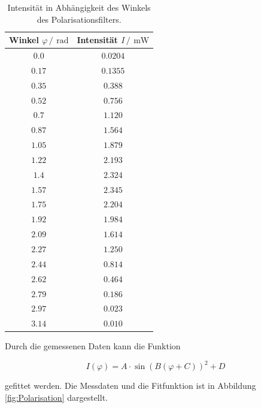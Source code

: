 \FloatBarrier
\begin{table}
  \centering
  \caption{Intensität in Abhängigkeit des Winkels des Polarisationsfilters.}
  \label{tab:Polarisation}
  \begin{tabular}{c c}
    \toprule
    Winkel $\varphi \,/\,\SI{}{\radian}$&Intensität $I\,/\,\SI{}{\milli\watt}$\\
    \midrule
    $\num{0.0}$&$\num{0.0204}$\\
    $\num{0.17}$&$\num{0.1355}$\\
    $\num{0.35}$&$\num{0.388}$\\
    $\num{0.52}$&$\num{0.756}$\\
    $\num{0.7}$&$\num{1.120}$\\
    $\num{0.87}$&$\num{1.564}$\\
    $\num{1.05}$&$\num{1.879}$\\
    $\num{1.22}$&$\num{2.193}$\\
    $\num{1.4}$&$\num{2.324}$\\
    $\num{1.57}$&$\num{2.345}$\\
    $\num{1.75}$&$\num{2.204}$\\
    $\num{1.92}$&$\num{1.984}$\\
    $\num{2.09}$&$\num{1.614}$\\
    $\num{2.27}$&$\num{1.250}$\\
    $\num{2.44}$&$\num{0.814}$\\
    $\num{2.62}$&$\num{0.464}$\\
    $\num{2.79}$&$\num{0.186}$\\
    $\num{2.97}$&$\num{0.023}$\\
    $\num{3.14}$&$\num{0.010}$\\
    \bottomrule
  \end{tabular}
\end{table} 
\FloatBarrier

Durch die gemessenen Daten kann die Funktion

\begin{equation}
  \label{eq:Sin2}
  I(\varphi)=A\cdot\sin{\left(B\left(\varphi+C\right)\right)}^2 + D
\end{equation}

gefittet werden.
Die Messdaten und die Fitfunktion ist in Abbildung \ref{fig:Polarisation} dargestellt.

